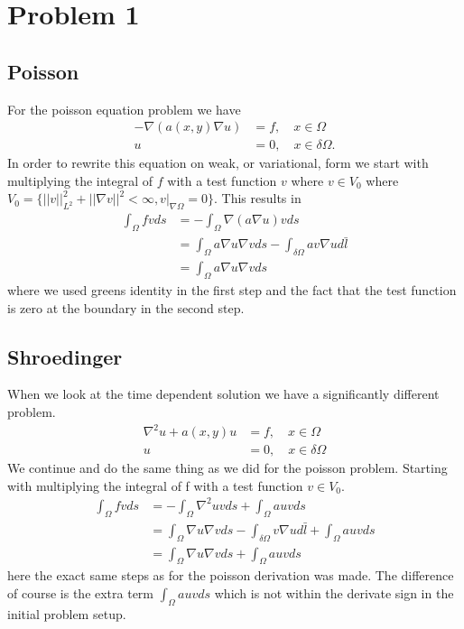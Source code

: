 \documentclass[11pt]{article}
\begin{document}
\section{Problem 1}
\subsection{Poisson}
For the poisson equation problem we have
\begin{align}
	-\nabla (a(x,y)\nabla u) &= f,\quad x\in \Omega \\
	u &= 0,\quad x\in \delta \Omega.
\end{align}
In order to rewrite this equation on weak, or variational, form we start with multiplying the integral of $f$ with a test function $v$ where $v\in V_0$ where $V_0 = \{ ||v||^2_{L^2} + ||\nabla v||^2 < \infty, v|_{\nabla \Omega} = 0\}$. This results in
\begin{align}
	\int_{\Omega} f v d s &= - \int_{\Omega} \nabla (a \nabla u) v ds \\
	&= \int_{\Omega} a \nabla u \nabla v ds - \int_{\delta \Omega} a v \nabla u d\bar{l} \\
	&= \int_{\Omega} a \nabla u \nabla v ds
\end{align}
where we used greens identity in the first step and the fact that the test function is zero at the boundary in the second step.
\subsection{Shroedinger}
When we look at the time dependent solution we have a significantly different problem.
\begin{align}
	\nabla^2 u + a(x,y) u &= f, \quad x\in \Omega \\
	u &= 0, \quad x \in \delta \Omega
\end{align}
We continue and do the same thing as we did for the poisson problem. Starting with multiplying the integral of f with a test function $v \in V_0$.
\begin{align}
	\int_{\Omega} f v d s &= - \int_{\Omega} \nabla^2 u v ds + \int_{\Omega} auv ds \\
	&= \int_{\Omega} \nabla u\nabla vds-\int_{\delta\Omega} v \nabla u d\bar{l} + \int_{\Omega} auvds \\
	&= \int_{\Omega} \nabla u \nabla v ds + \int_{\Omega} a u v ds
\end{align}
here the exact same steps as for the poisson derivation was made. The difference of course is the extra term $\int_{\Omega} a u v ds$ which is not within the derivate sign in the initial problem setup.
\end{document}
